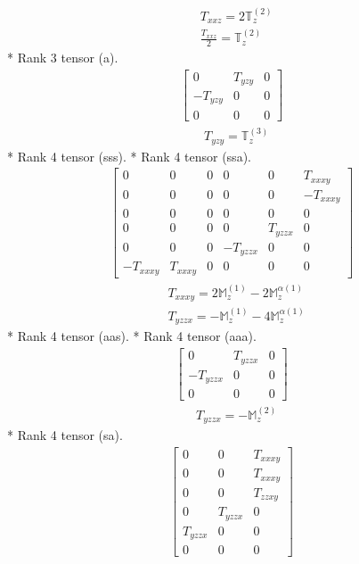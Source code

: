 \documentclass[fleqn,8pt,landscape]{jsarticle}
\begin{document}
\begin{align*}
& T_{xxz} = 2 \mathbb{T}_{z}^{(2)} \\
& \frac{T_{xxz}}{2} = \mathbb{T}_{z}^{(2)}
\end{align*}
* Rank 3 tensor (a).
\begin{align*}
\begin{bmatrix} 0 & T_{yzy} & 0 \\ - T_{yzy} & 0 & 0 \\ 0 & 0 & 0 \end{bmatrix}
\end{align*}
\begin{align*}
& T_{yzy} = \mathbb{T}_{z}^{(3)}
\end{align*}
* Rank 4 tensor (sss).
* Rank 4 tensor (ssa).
\begin{align*}
\begin{bmatrix} 0 & 0 & 0 & 0 & 0 & T_{xxxy} \\ 0 & 0 & 0 & 0 & 0 & - T_{xxxy} \\ 0 & 0 & 0 & 0 & 0 & 0 \\ 0 & 0 & 0 & 0 & T_{yzzx} & 0 \\ 0 & 0 & 0 & - T_{yzzx} & 0 & 0 \\ - T_{xxxy} & T_{xxxy} & 0 & 0 & 0 & 0 \end{bmatrix}
\end{align*}
\begin{align*}
& T_{xxxy} = 2 \mathbb{M}_{z}^{(1)} - 2 \mathbb{M}_{z}^{\alpha(1)} \\
& T_{yzzx} = - \mathbb{M}_{z}^{(1)} - 4 \mathbb{M}_{z}^{\alpha(1)}
\end{align*}
* Rank 4 tensor (aas).
* Rank 4 tensor (aaa).
\begin{align*}
\begin{bmatrix} 0 & T_{yzzx} & 0 \\ - T_{yzzx} & 0 & 0 \\ 0 & 0 & 0 \end{bmatrix}
\end{align*}
\begin{align*}
& T_{yzzx} = - \mathbb{M}_{z}^{(2)}
\end{align*}
* Rank 4 tensor (sa).
\begin{align*}
\begin{bmatrix} 0 & 0 & T_{xxxy} \\ 0 & 0 & T_{xxxy} \\ 0 & 0 & T_{zzxy} \\ 0 & T_{yzzx} & 0 \\ T_{yzzx} & 0 & 0 \\ 0 & 0 & 0 \end{bmatrix}
\end{align*}
\end{document}
